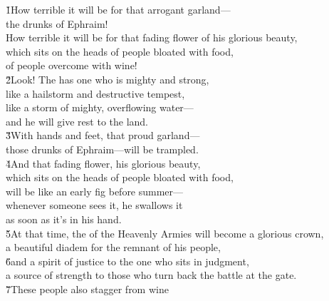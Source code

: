 \begin{poetry}
\poeml {}
\v{1}How terrible it will be for that arrogant garland--- \\
\poeml the drunks of Ephraim! \\
\poeml How terrible it will be for that fading flower of his glorious beauty, \\
\poemll    which sits on the heads of people bloated with food, \\
\poemlll       of people overcome with wine! \\
\poeml \v{2}Look! The  has one who is mighty and strong, \\
\poemll    like a hailstorm and destructive tempest, \\
\poeml like a storm of mighty, overflowing water--- \\
\poemll    and he will give rest to the land. \\
\poeml \v{3}With hands and feet, that proud garland--- \\
\poemll    those drunks of Ephraim---will be trampled. \\
\poeml \v{4}And that fading flower, his glorious beauty, \\
\poemll    which sits on the heads of people bloated with food, \\
\poeml will be like an early fig before summer--- \\
\poemll    whenever someone sees it, he swallows it \\
\poemlll       as soon as it's in his hand. \\
\poeml \v{5}At that time, the  of the Heavenly Armies will become a glorious crown, \\
\poemll    a beautiful diadem for the remnant of his people, \\
\poeml \v{6}and a spirit of justice to the one who sits in judgment, \\
\poemll    a source of strength to those who turn back the battle at the gate. \\
\poeml \v{7}These people also stagger from wine \\

\end{poetry}

